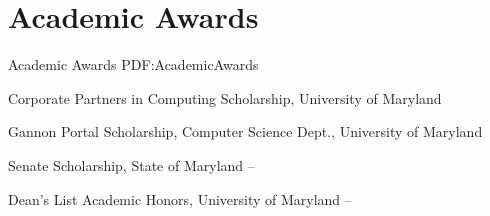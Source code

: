 
\section
{Academic Awards}
{Academic Awards}
{PDF:AcademicAwards}

\BulletItem
Corporate Partners in Computing Scholarship,
University of Maryland
\hfill
{}

\GapNoBreak
\BulletItem
Gannon Portal Scholarship,
Computer Science Dept., 
University of Maryland
\hfill
{}

\GapNoBreak
\BulletItem
Senate Scholarship,
State of Maryland
\hfill
{} --

\GapNoBreak
\BulletItem
Dean's List Academic Honors,
University of Maryland
\hfill
{} --
\Gap